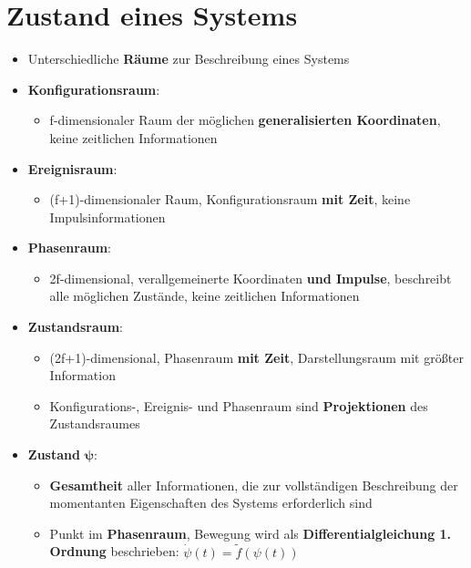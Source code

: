 \section{Zustand eines Systems}
\label{hform:sec:zustand_eines_systems}

\begin{itemize}
	\item Unterschiedliche \textbf{Räume} zur Beschreibung eines Systems
	\item \textbf{Konfigurationsraum}:
	\begin{itemize}
		\item f-dimensionaler Raum der möglichen \textbf{generalisierten Koordinaten}, keine zeitlichen Informationen
	\end{itemize}
	\item \textbf{Ereignisraum}:
	\begin{itemize}
		\item (f+1)-dimensionaler Raum, Konfigurationsraum \textbf{mit Zeit}, keine Impulsinformationen
	\end{itemize}
	\item \textbf{Phasenraum}:
	\begin{itemize}
		\item 2f-dimensional, verallgemeinerte Koordinaten \textbf{und Impulse}, beschreibt alle möglichen Zustände, keine zeitlichen Informationen
	\end{itemize}
	\item \textbf{Zustandsraum}:
	\begin{itemize}
		\item (2f+1)-dimensional, Phasenraum \textbf{mit Zeit}, Darstellungsraum mit größter Information
		\item Konfigurations-, Ereignis- und Phasenraum sind \textbf{Projektionen} des Zustandsraumes
	\end{itemize}
	\item \textbf{Zustand} $\mathbf{\psi}$:
	\begin{itemize}
		\item \textbf{Gesamtheit} aller Informationen, die zur vollständigen Beschreibung der momentanten Eigenschaften des Systems erforderlich sind
		\item Punkt im \textbf{Phasenraum}, Bewegung wird als \textbf{Differentialgleichung 1. Ordnung} beschrieben: $\dot{\psi}(t) = \widetilde{f}(\psi(t))$
	\end{itemize}
\end{itemize}